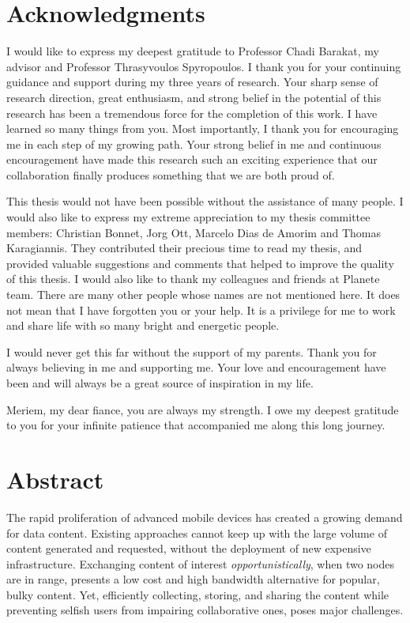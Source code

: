 \documentclass[a4paper,11pt,twoside]{ThesisStyle}
\begin{document}


\dominitoc


\cleardoublepage

\section*{Acknowledgments}

I would like to express my deepest gratitude to Professor Chadi Barakat, my advisor and Professor Thrasyvoulos Spyropoulos. I thank you for your continuing guidance and support during my three years of research. Your sharp sense of research direction, great enthusiasm, and strong belief in the potential of this research has been a tremendous force for the completion of this work. I have learned so many things from you. Most importantly, I thank you for encouraging me in each step of my growing path. Your strong belief in me and continuous encouragement have made this research such an exciting experience that our collaboration finally produces something that we are both proud of.

This thesis would not have been possible without the assistance of many people. I would also like to express my extreme appreciation to my thesis committee members: Christian Bonnet, Jorg Ott, Marcelo Dias de Amorim and Thomas Karagiannis. They contributed their precious time to read my thesis, and provided valuable suggestions and comments that helped to improve the quality of this thesis. I would also like to thank my colleagues and friends at Planete team. There are many other people whose names are not mentioned here. It does not mean that I have forgotten you or your help. It is a privilege for me to work and share life with so many bright and energetic people. 

I would never get this far without the support of my parents. Thank you for always believing in me and supporting me. Your love and encouragement have been and will always be a great source of inspiration in my life.  

Meriem, my dear fiance, you are always my strength. I owe my deepest gratitude to you for your infinite patience that accompanied me along this long journey.

\cleardoublepage

\section*{Abstract}
The rapid proliferation of advanced mobile devices has created a growing demand for data content. Existing approaches cannot keep up with the large volume of content generated and requested, without the deployment of new expensive infrastructure. Exchanging content of interest \emph{opportunistically}, when two nodes are in range, presents a low cost and high bandwidth alternative for popular, bulky content. Yet, efficiently collecting, storing, and sharing the content while preventing selfish users from impairing collaborative ones, poses major challenges.
\end{document}

